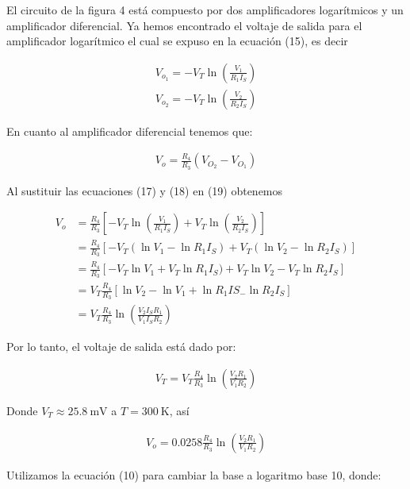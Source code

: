 \documentclass{article}
\begin{document}
\noindent El circuito de la figura 4 está compuesto por dos amplificadores logarítmicos y un amplificador diferencial. Ya hemos encontrado el voltaje de salida para el amplificador logarítmico el cual se expuso en la ecuación (15), es decir

\begin{align}
	V_{o_1} =  -V_T \ln \left( \frac{V_1}{R_1I_S} \right) \\
	V_{o_2} =  -V_T \ln \left( \frac{V_2}{R_2I_S} \right)
\end{align}

En cuanto al amplificador diferencial tenemos que:

\begin{align}
	V_o = \frac{R_4}{R_3} \left( V_{O_2} - V_{O_1} \right)
\end{align}

\noindent Al sustituir las ecuaciones (17) y (18) en (19) obtenemos

\begin{align}
		V_o &= \frac{R_4}{R_3} \left[  -V_T \ln \left( \frac{V_1}{R_1I_S} \right) + V_T \ln \left( \frac{V_2}{R_2I_S} \right) \right] \nonumber \\ 
		&= \frac{R_4}{R_3} \left[ -V_T (\ln V_1 - \ln R_1 I_S) + V_T (\ln V_2 - \ln R_2I_S) \right] \nonumber \\
		&= \frac{R_4}{R_3} \left[ -V_T\ln V_1 + V_T \ln R_1 I_S) + V_T \ln V_2 - V_T \ln R_2I_S \right] \nonumber \\
		&= V_T\frac{R_4}{R_3} \left[ \ln V_2 - \ln V_1 + \ln R_1IS_ - \ln R_2I_S \right] \nonumber \\
		&= V_T\frac{R_4}{R_3} \ln \left( \frac{V_2I_SR_1}{V_1I_SR_2} \right)
\end{align}

\noindent Por lo tanto, el voltaje de salida está dado por:

\begin{align}
	V_T = V_T \frac{R_4}{R_3} \ln \left( \frac{V_2R_1}{V_1R_2} \right)
\end{align}

\noindent Donde $V_T \approx \qty{25.8}{\milli \volt}$ a $T = \qty{300}{\kelvin}$, así

\begin{align}
	V_o = 0.0258 \frac{R_4}{R_3} \ln \left( \frac{V_2R_1}{V_1R_2} \right)
\end{align}

\noindent Utilizamos la ecuación (10) para cambiar la base a logaritmo base 10, donde:
\end{document}
